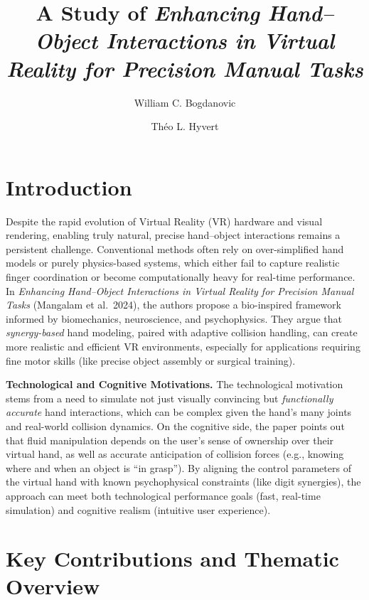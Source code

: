 \documentclass[11pt]{llncs}
\begin{document}
\title{A Study of \textit{Enhancing Hand--Object Interactions in Virtual Reality for Precision Manual Tasks}}
\author{William C. Bogdanovic \and Théo L. Hyvert}
\maketitle

\section*{Introduction}
Despite the rapid evolution of Virtual Reality (VR) hardware and visual rendering, enabling truly natural, precise hand--object interactions remains a persistent challenge. Conventional methods often rely on over-simplified hand models or purely physics-based systems, which either fail to capture realistic finger coordination or become computationally heavy for real-time performance. In \emph{Enhancing Hand--Object Interactions in Virtual Reality for Precision Manual Tasks} (Mangalam et al.\ 2024), the authors propose a bio-inspired framework informed by biomechanics, neuroscience, and psychophysics. They argue that \emph{synergy-based} hand modeling, paired with adaptive collision handling, can create more realistic and efficient VR environments, especially for applications requiring fine motor skills (like precise object assembly or surgical training).

\vspace{1em}
\noindent
\textbf{Technological and Cognitive Motivations.} The technological motivation stems from a need to simulate not just visually convincing but \emph{functionally accurate} hand interactions, which can be complex given the hand's many joints and real-world collision dynamics. On the cognitive side, the paper points out that fluid manipulation depends on the user's sense of ownership over their virtual hand, as well as accurate anticipation of collision forces (e.g., knowing where and when an object is ``in grasp''). By aligning the control parameters of the virtual hand with known psychophysical constraints (like digit synergies), the approach can meet both technological performance goals (fast, real-time simulation) and cognitive realism (intuitive user experience).

\section*{Key Contributions and Thematic Overview}
\end{document}

